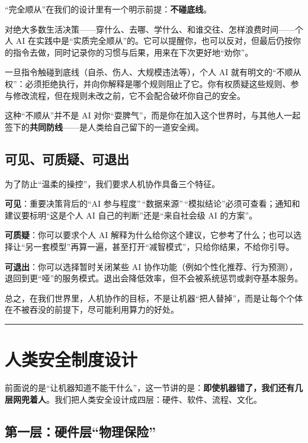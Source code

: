 ``完全顺从''在我们的设计里有一个明示前提：\textbf{不碰底线}。

对绝大多数生活决策------穿什么、去哪、学什么、和谁交往、怎样浪费时间------个人 AI 在实践中是``实质完全顺从''的。它可以提醒你，也可以反对，但最后仍按你的指令去做，同时记录你的习惯与后果，用来在下次更好地``劝你''。

一旦指令触碰到底线（自杀、伤人、大规模违法等），个人 AI 就有明文的``不顺从权''：必须拒绝执行，并向你解释是哪个规则阻止了它。你有权质疑这些规则、参与修改流程，但在规则未改之前，它不会配合破坏你自己的安全。

这种``不顺从''并不是 AI 对你``耍脾气''，而是你在加入这个世界时，与其他人一起签下的\textbf{共同防线}------是人类给自己留下的一道安全阀。

\subsection{可见、可质疑、可退出}\label{ux53efux89c1ux53efux8d28ux7591ux53efux9000ux51fa}

为了防止``温柔的操控''，我们要求人机协作具备三个特征。

\textbf{可见}：重要决策背后的``AI 参与程度''\,``数据来源''\,``模拟结论''必须可查看；通知和建议要标明``这是个人 AI 自己的判断''还是``来自社会级 AI 的方案''。

\textbf{可质疑}：你可以要求个人 AI 解释为什么给你这个建议，它参考了什么；也可以选择让``另一套模型''再算一遍，甚至打开``减智模式''，只给你结果，不给你引导。

\textbf{可退出}：你可以选择暂时关闭某些 AI 协作功能（例如个性化推荐、行为预测），退回到更``哑''的服务模式。退出会降低效率，但不会被系统惩罚或剥夺基本服务。

总之，在我们世界里，人机协作的目标，不是让机器``把人替掉''，而是让每个个体在不被吞没的前提下，尽可能利用算力的好处。

\begin{center}\rule{0.5\linewidth}{0.5pt}\end{center}

\section{人类安全制度设计}\label{ux4ebaux7c7bux5b89ux5168ux5236ux5ea6ux8bbeux8ba1}

前面说的是``让机器知道不能干什么''，这一节讲的是：\textbf{即使机器错了，我们还有几层网兜着人}。我们把人类安全设计成四层：硬件、软件、流程、文化。

\subsection{第一层：硬件层``物理保险''}\label{ux7b2cux4e00ux5c42ux786cux4ef6ux5c42ux7269ux7406ux4fddux9669}

